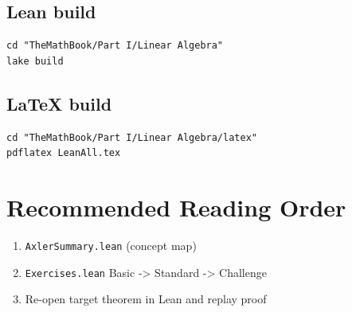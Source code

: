 \documentclass[11pt]{article}
\begin{document}
\subsection*{Lean build}
\begin{verbatim}
cd "TheMathBook/Part I/Linear Algebra"
lake build
\end{verbatim}

\subsection*{LaTeX build}
\begin{verbatim}
cd "TheMathBook/Part I/Linear Algebra/latex"
pdflatex LeanAll.tex
\end{verbatim}

\section*{Recommended Reading Order}
\begin{enumerate}[leftmargin=1.5em]
  \item \texttt{AxlerSummary.lean} (concept map)
  \item \texttt{Exercises.lean} Basic -> Standard -> Challenge
  \item Re-open target theorem in Lean and replay proof
\end{enumerate}
\end{document}
